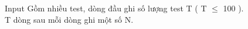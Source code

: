 Input
Gồm nhiều test, dòng đầu ghi số lượng test T ( T $\le$ 100 ).   
\\   T dòng sau mỗi dòng ghi một số N.